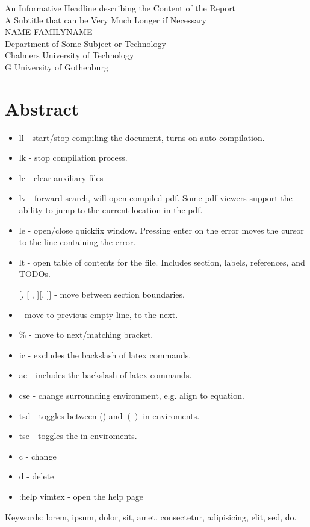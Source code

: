 An Informative Headline describing the Content of the Report\\
A Subtitle that can be Very Much Longer if Necessary\\
NAME FAMILYNAME\\
Department of Some Subject or Technology\\
Chalmers University of Technology\\
\if\InstitutionLocation G
University of Gothenburg\\
\fi
\setlength{\parskip}{0.5cm}

\thispagestyle{plain}			%
\setlength{\parskip}{0pt plus 1.0pt}
\section*{Abstract}

\begin{itemize}
    \item ll - start/stop compiling the document, turns on auto compilation.
    \item lk - stop compilation process. 
    \item lc - clear auxiliary files 
    \item lv - forward search, will open compiled pdf. Some pdf viewers support the ability to jump to the current location in the pdf. 
    \item le - open/close quickfix window. Pressing enter on the error moves the cursor to the line containing the error. 
    \item lt - open table of contents for the file. Includes section, labels, references, and TODOs. 
    \item [[, [], ][, ]] - move between section boundaries. 
    \item { - move to previous empty line, } to the next. 
    \item \% - move to next/matching bracket. 
    \item ic - excludes the backslash of latex commands. 
    \item ac - includes the backslash of latex commands. 
    \item cse - change surrounding environment, e.g. align to equation. 
    \item tsd - toggles between () and \( \left( \right) \) in enviroments.
    \item tse - toggles the \* in enviroments.
    \item c - change 
    \item d - delete 
    \item :help vimtex - open the help page

\end{itemize}



\vfill
Keywords: lorem, ipsum, dolor, sit, amet, consectetur, adipisicing, elit, sed, do.

\newpage				%
\thispagestyle{empty}
\mbox{}
